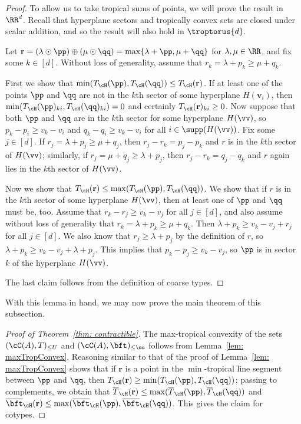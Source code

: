 \begin{proof} 
To allow us to take tropical sums of points, we will prove the result in $\RR^d$.
Recall that hyperplane sectors and tropically convex sets are closed under scalar addition, and so the result will also hold in $\troptorus{d}$.

Let ${\mathbf r} = (\lambda \odot \pp) \oplus (\mu \odot \qq) = \max\{\lambda + \pp, \mu+\qq\}$ for $\lambda, \mu\in \RR$, and fix some $k\in[d]$. Without loss of generality, assume that $r_k = \lambda+p_k \geq \mu + q_k$.

First we show that $\min(T_\cH(\pp),T_\cH(\qq)) \leq T_\cH({\mathbf r})$. If at least one of the points $\pp$ and $\qq$ are not in the $k$th sector of some hyperplane $H({\mathbf v}_i)$, then $\min(T_\cH(\pp)_{ki},T_\cH(\qq)_{ki}) = 0$ and certainly $T_\cH({\mathbf r})_{ki}\geq 0$.
Now suppose that both $\pp$ and $\qq$ are in the $k$th sector for some hyperplane $H(\vv)$, so $p_k-p_i \geq v_k-v_i$ and $q_k - q_i \geq v_k - v_i$ for all $i\in\supp(H(\vv))$. Fix some $j\in [d]$. If $r_j = \lambda + p_j \geq \mu + q_j$, then $r_j - r_k = p_j - p_k$ and $r$ is in the $k$th sector of $H(\vv)$; similarly, if $r_j = \mu + q_j \geq \lambda + p_j$, then $r_j - r_k = q_j - q_k$ and $r$ again lies in the $k$th sector of $H(\vv)$.

Now we show that $T_\cH({\mathbf r}) \leq \max(T_\cH(\pp), T_\cH(\qq))$. We show that if $r$ is in the $k$th sector of some hyperplane $H(\vv)$, then at least one of $\pp$ and $\qq$ must be, too. Assume that $r_k - r_j \geq v_k - v_j$ for all $j\in [d]$, and also assume without loss of generality that $r_k = \lambda+p_k \geq \mu + q_k$. Then $\lambda + p_k \geq v_k - v_j + r_j$ for all $j\in [d]$. We also know that $r_j \geq \lambda + p_j$ by the definition of $r$, so $\lambda + p_k \geq v_k - v_j + \lambda + p_j$. This implies that $p_k - p_j \geq v_k - v_j$, so $\pp$ is in sector $k$ of the hyperplane $H(\vv)$.

The last claim follows from the definition of coarse types.
\end{proof}

With this lemma in hand, we may now prove the main theorem of this subsection.

\begin{proof}[Proof of Theorem~\ref{thm: contractible}] The max-tropical convexity of the sets $(\cC(A),T)_{\leq U}$ and $(\cC(A),\bft)_{\leq \uu}$ follows from Lemma~\ref{lem: maxTropConvex}.
Reasoning similar to that of the proof of Lemma~\ref{lem: maxTropConvex} shows that if ${\mathbf r}$ is a point in the $\min$-tropical line segment between $\pp$ and $\qq$, then $T_\cH({\mathbf r}) \geq \min(T_\cH(\pp), T_\cH(\qq))$; passing to complements, we obtain that $\overline T_{\cH}({\mathbf r}) \leq \max(\overline{T}_\cH(\pp), \overline{T}_\cH(\qq))$ and $\overline \bft_{\cH}({\mathbf r}) \leq \max(\overline{\bft}_\cH(\pp), \overline{\bft}_\cH(\qq))$.
This gives the claim for cotypes.
\end{proof}

